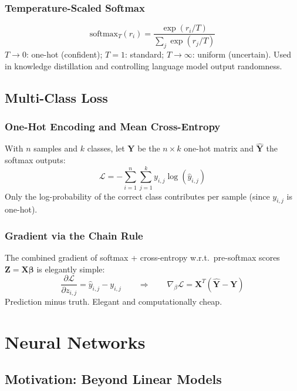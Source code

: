 \documentclass[11pt]{article}
\begin{document}
\subsubsection{Temperature-Scaled Softmax}

\[
\text{softmax}_T(r_i) = \frac{\exp(r_i/T)}{\sum_j \exp(r_j/T)}
\]
$T \to 0$: one-hot (confident); $T = 1$: standard; $T \to \infty$: uniform (uncertain). Used in knowledge distillation and controlling language model output randomness.

\subsection{Multi-Class Loss}

\subsubsection{One-Hot Encoding and Mean Cross-Entropy}

With $n$ samples and $k$ classes, let $\boldsymbol{Y}$ be the $n \times k$ one-hot matrix and $\hat{\boldsymbol{Y}}$ the softmax outputs:
\[
\boxed{\mathcal{L} = -\sum_{i=1}^{n}\sum_{j=1}^{k} y_{i,j}\log(\hat{y}_{i,j})}
\]
Only the log-probability of the correct class contributes per sample (since $y_{i,j}$ is one-hot).

\subsubsection{Gradient via the Chain Rule}

The combined gradient of softmax + cross-entropy w.r.t.\ pre-softmax scores $\boldsymbol{Z} = \boldsymbol{X}\boldsymbol{\beta}$ is elegantly simple:
\[
\frac{\partial\mathcal{L}}{\partial z_{i,j}} = \hat{y}_{i,j} - y_{i,j}
\qquad \Longrightarrow \qquad
\boxed{\nabla_\beta \mathcal{L} = \boldsymbol{X}^T(\hat{\boldsymbol{Y}} - \boldsymbol{Y})}
\]
Prediction minus truth. Elegant and computationally cheap.

\section{Neural Networks}

\subsection{Motivation: Beyond Linear Models}
\end{document}
